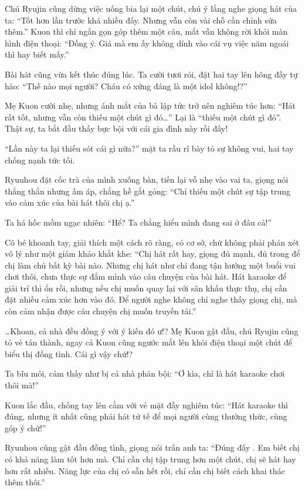 \documentclass[../main.tex]{subfiles}
\begin{document}
Chú Ryujin cũng dừng việc uống bia lại một chút, chú ý lắng nghe giọng hát của ta: ``Tốt hơn lần trước khá nhiều đấy. Nhưng vẫn còn vài chỗ cần chỉnh sửa thêm.'' Kuon thì chỉ ngắn gọn góp thêm một câu, mắt vẫn không rời khỏi màn hình điện thoại: ``Đồng ý. Giá mà em ấy không dính vào cái vụ việc năm ngoái thì hay biết mấy.''

Bài hát cũng vừa kết thúc đúng lúc. Ta cười tươi rói, đặt hai tay lên hông đầy tự hào: ``Thế nào mọi người? Cháu có xứng đáng là một idol không!?''

Mẹ Kuon cười nhẹ, nhưng ánh mắt của bà lập tức trở nên nghiêm túc hơn: ``Hát rất tốt, nhưng vẫn còn thiếu một chút gì đó\dots'' Lại là ``thiếu một chút gì đó''. Thật sự, ta bắt đầu thấy bực bội với cái gia đình này rồi đấy!

``Lần này ta lại thiếu sót cái gì nữa?'' mặt ta rầu rĩ bày tỏ sự không vui, hai tay chống nạnh tức tối.

Ryuuhou đặt cốc trà của mình xuống bàn, tiến lại vỗ nhẹ vào vai ta, giọng nói thẳng thắn nhưng ấm áp, chẳng hề gắt gỏng: ``Chỉ thiếu một chút sự tập trung vào cảm xúc của bài hát thôi chị ạ.''

Ta há hốc mồm ngạc nhiên: ``Hể? Ta chẳng hiểu mình đang sai ở đâu cả!''

Cô bé khoanh tay, giải thích một cách rõ ràng, có cơ sở, chứ không phải phán xét vô lý như một giám khảo khắt khe: ``Chị hát rất hay, giọng đủ mạnh, đủ trong để chị làm chủ bất kỳ bài nào. Nhưng chị hát như chỉ đang tận hưởng một buổi vui chơi thôi, chưa thực sự đắm mình vào câu chuyện của bài hát. Hát karaoke để giải trí thì ổn rồi, nhưng nếu chị muốn quay lại với sân khấu thực thụ, chị cần đặt nhiều cảm xúc hơn vào đó. Để người nghe không chỉ nghe thấy giọng chị, mà còn cảm nhận được câu chuyện chị muốn truyền tải.''

\dots Khoan, cả nhà đều đồng ý với ý kiến đó ư!? Mẹ Kuon gật đầu, chú Ryujin cũng tỏ vẻ tán thành, ngay cả Kuon cũng ngước mắt lên khỏi điện thoại một chút để biểu thị đồng tình. Cái gì vậy chứ!?

Ta bĩu môi, cảm thấy như bị cả nhà phản bội: ``Ơ kìa, chỉ là hát karaoke chơi thôi mà!''

Kuon lắc đầu, chống tay lên cằm với vẻ mặt đầy nghiêm túc: ``Hát karaoke thì đúng, nhưng ít nhất cũng phải hát tử tế để mọi người cùng thưởng thức, cùng góp ý chứ!''

Ryuuhou cũng gật đầu đồng tình, giọng nói trấn anh ta: ``Đúng đấy . Em biết chị có khả năng làm tốt hơn mà. Chỉ cần chị tập trung hơn một chút, chị sẽ hát hay hơn rất nhiều. Năng lực của chị có sẵn hết rồi, chỉ cần chị biết cách khai thác thêm thôi.''
\end{document}
